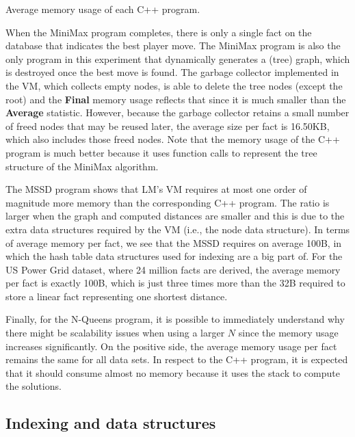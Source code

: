 \begin{table}[ht]
   \begin{center}
      
   \end{center}
   \caption{Average memory usage of each C++ program.}
   \label{table:implementation:cmem}
\end{table}

When the MiniMax program completes, there is only a single fact on the database
that indicates the best player move. The MiniMax program is also the only
program in this experiment that dynamically generates a (tree) graph, which is
destroyed once the best move is found. The garbage collector implemented in the
VM, which collects empty nodes, is able to delete the tree nodes (except the
root) and the \textbf{Final} memory usage reflects that since it is much smaller
than the \textbf{Average} statistic. However, because the garbage collector
retains a small number of freed nodes that may be reused later, the average size
per fact is 16.50KB, which also includes those freed nodes. Note that the memory
usage of the C++ program is much better because it uses function calls to
represent the tree structure of the MiniMax algorithm.

The MSSD program shows that LM's VM requires at most one order of magnitude more
memory than the corresponding C++ program. The ratio is larger when the graph
and computed distances are smaller and this is due to the extra data structures
required by the VM (i.e., the node data structure). In terms of average memory
per fact, we see that the MSSD requires on average 100B, in which the hash table
data structures used for indexing are a big part of. For the US Power Grid
dataset, where 24 million facts are derived, the average memory per fact is
exactly 100B, which is just three times more than the 32B required to store a
linear fact representing one shortest distance.

Finally, for the N-Queens program, it is possible to immediately understand why
there might be scalability issues when using a larger $N$ since the memory usage
increases significantly. On the positive side, the average memory usage per fact
remains the same for all data sets. In respect to the C++ program, it is
expected that it should consume almost no memory because it uses the stack to
compute the solutions.

\subsection{Indexing and data structures}

